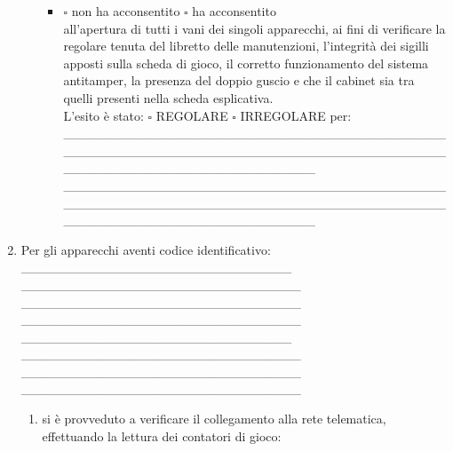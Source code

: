 \documentclass[12pt]{article}
\begin{document}
\begin{enumerate}[resume]
\begin{itemize}[label={}]
\begin{itemize}[]
            \item \begin{math}\square\end{math} non ha acconsentito \begin{math}\square\end{math} ha acconsentito \\
            all'apertura di tutti i vani dei singoli apparecchi, ai fini di verificare la regolare tenuta del libretto delle manutenzioni, l’integrità dei sigilli apposti sulla scheda di gioco, il corretto funzionamento del sistema antitamper, la presenza del doppio guscio e che il cabinet sia tra quelli presenti nella scheda esplicativa.\\
            L'esito è stato: \begin{math}\square\end{math} REGOLARE \begin{math}\square\end{math} IRREGOLARE per:\\
            \_\_\_\_\_\_\_\_\_\_\_\_\_\_\_\_\_\_\_\_\_\_\_\_\_\_\_\_\_\_\_\_\_\_\_\_\_\_\_\_\_\_\_\_\_\_\_\_\_\_\_\_\_\_\_\_\_\_\_\_\_\_\_\_\_\_\_\_\_\_\_\_\_\_\_\_\_\_\_\_\_\_\_\_\_\_\_\_\_\_\_\_\_\_\_\_\_\_\_\_\_\_\_\_\_\_\_\_\_ \\
            \_\_\_\_\_\_\_\_\_\_\_\_\_\_\_\_\_\_\_\_\_\_\_\_\_\_\_\_\_\_\_\_\_\_\_\_\_\_\_\_\_\_\_\_\_\_\_\_\_\_\_\_\_\_\_\_\_\_\_\_\_\_\_\_\_\_\_\_\_\_\_\_\_\_\_\_\_\_\_\_\_\_\_\_\_\_\_\_\_\_\_\_\_\_\_\_\_\_\_\_\_\_\_\_\_\_\_\_\_ 
        \end{itemize}
    \end{itemize}
    \item Per gli apparecchi aventi codice identificativo:\\
    \_\_\_\_\_\_\_\_\_\_\_\_\_\_\_\_\_\_\_\_\_\_\_\_\_\_\_\_\_ \_\_\_\_\_\_\_\_\_\_\_\_\_\_\_\_\_\_\_\_\_\_\_\_\_\_\_\_\_\_   \_\_\_\_\_\_\_\_\_\_\_\_\_\_\_\_\_\_\_\_\_\_\_\_\_\_\_\_\_\_ \_\_\_\_\_\_\_\_\_\_\_\_\_\_\_\_\_\_\_\_\_\_\_\_\_\_\_\_\_\_ \\
    \_\_\_\_\_\_\_\_\_\_\_\_\_\_\_\_\_\_\_\_\_\_\_\_\_\_\_\_\_ \_\_\_\_\_\_\_\_\_\_\_\_\_\_\_\_\_\_\_\_\_\_\_\_\_\_\_\_\_\_   \_\_\_\_\_\_\_\_\_\_\_\_\_\_\_\_\_\_\_\_\_\_\_\_\_\_\_\_\_\_ \_\_\_\_\_\_\_\_\_\_\_\_\_\_\_\_\_\_\_\_\_\_\_\_\_\_\_\_\_\_ 
    \begin{enumerate}
        \item si è provveduto a verificare il collegamento alla rete telematica, effettuando la lettura dei contatori di gioco:
        \begin{itemize}[label={}]

\end{itemize}
\end{enumerate}
\end{enumerate}
\end{document}
